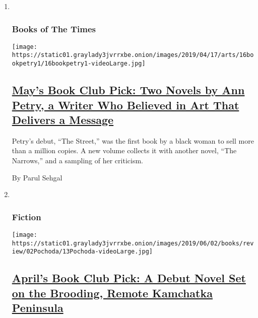 \begin{enumerate}
\def\labelenumi{\arabic{enumi}.}
\item ~
  \hypertarget{books-of-the-times}{%
  \subsubsection{Books of The Times}\label{books-of-the-times}}

  \texttt{[image: https://static01.graylady3jvrrxbe.onion/images/2019/04/17/arts/16bookpetry1/16bookpetry1-videoLarge.jpg]}

  \hypertarget{mays-book-club-pick-two-novels-by-ann-petry-a-writer-who-believed-in-art-that-delivers-a-message}{%
  \subsection{\texorpdfstring{\href{/2019/04/16/books/review-street-narrows-ann-petry.html}{May's
  Book Club Pick: Two Novels by Ann Petry, a Writer Who Believed in Art
  That Delivers a
  Message}}{May's Book Club Pick: Two Novels by Ann Petry, a Writer Who Believed in Art That Delivers a Message}}\label{mays-book-club-pick-two-novels-by-ann-petry-a-writer-who-believed-in-art-that-delivers-a-message}}

  Petry's debut, ``The Street,'' was the first book by a black woman to
  sell more than a million copies. A new volume collects it with another
  novel, ``The Narrows,'' and a sampling of her criticism.

  By Parul Sehgal
\item ~
  \hypertarget{fiction-1}{%
  \subsubsection{Fiction}\label{fiction-1}}

  \texttt{[image: https://static01.graylady3jvrrxbe.onion/images/2019/06/02/books/review/02Pochoda/13Pochoda-videoLarge.jpg]}

  \hypertarget{aprils-book-club-pick-a-debut-novel-set-on-the-brooding-remote-kamchatka-peninsula}{%
  \subsection{\texorpdfstring{\href{/2019/05/14/books/review/disappearing-earth-julia-phillips.html}{April's
  Book Club Pick: A Debut Novel Set on the Brooding, Remote Kamchatka
  Peninsula}}{April's Book Club Pick: A Debut Novel Set on the Brooding, Remote Kamchatka Peninsula}}\label{aprils-book-club-pick-a-debut-novel-set-on-the-brooding-remote-kamchatka-peninsula}}


\end{enumerate}

